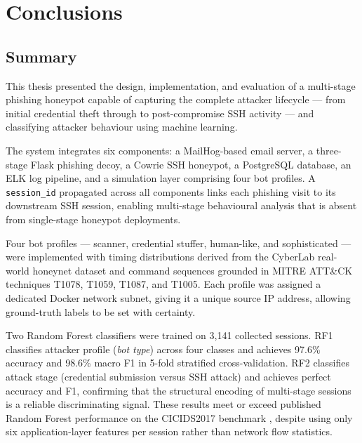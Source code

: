 
\chapter{Conclusions}\label{chapter:chap5}

\section{Summary}

This thesis presented the design, implementation, and evaluation of a
multi-stage phishing honeypot capable of capturing the complete attacker
lifecycle — from initial credential theft through to post-compromise SSH
activity — and classifying attacker behaviour using machine learning.

The system integrates six components: a MailHog-based email server, a
three-stage Flask phishing decoy, a Cowrie SSH honeypot, a PostgreSQL
database, an ELK log pipeline, and a simulation layer comprising four
bot profiles. A \texttt{session\_id} propagated across all components
links each phishing visit to its downstream SSH session, enabling
multi-stage behavioural analysis that is absent from single-stage
honeypot deployments.

Four bot profiles — scanner, credential stuffer, human-like, and
sophisticated — were implemented with timing distributions derived from
the CyberLab real-world honeynet dataset \cite{Alata2006Honeynet} and
command sequences grounded in MITRE ATT\&CK techniques T1078, T1059,
T1087, and T1005. Each profile was assigned a dedicated Docker network
subnet, giving it a unique source IP address, allowing ground-truth
labels to be set with certainty.

Two Random Forest classifiers were trained on 3,141 collected sessions.
RF1 classifies attacker profile (\textit{bot type}) across four classes
and achieves 97.6\% accuracy and 98.6\% macro F1 in 5-fold stratified
cross-validation. RF2 classifies attack stage (credential submission
versus SSH attack) and achieves perfect accuracy and F1, confirming
that the structural encoding of multi-stage sessions is a reliable
discriminating signal. These results meet or exceed published Random
Forest performance on the CICIDS2017 benchmark
\cite{Bringer2012HoneypotSurvey}, despite using only six
application-layer features per session rather than network flow
statistics.

